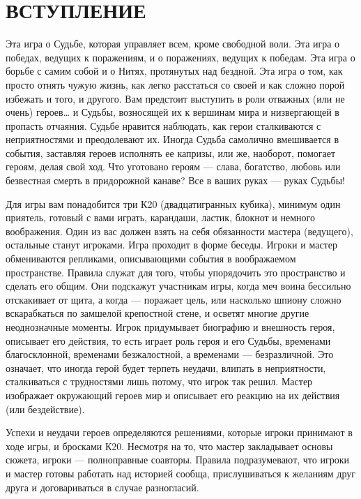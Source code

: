 \chapter*{ВСТУПЛЕНИЕ}
Эта игра о Судьбе, которая управляет всем, кроме свободной воли. Эта игра о победах, ведущих к поражениям, и о поражениях, ведущих к победам. Эта игра о борьбе с самим собой и о Нитях, протянутых над бездной. Эта игра о том, как просто отнять чужую жизнь, как легко расстаться со своей и как сложно порой избежать и того, и другого.
Вам предстоит выступить в роли отважных (или не очень) героев… и Судьбы, возносящей их к вершинам мира и низвергающей в пропасть отчаяния. Судьбе нравится наблюдать, как герои сталкиваются с неприятностями и преодолевают их. Иногда Судьба самолично вмешивается в события, заставляя героев исполнять ее капризы, или же, наоборот, помогает героям, делая свой ход. Что уготовано героям — слава, богатство, любовь или безвестная смерть в придорожной канаве? Все в ваших руках — руках Судьбы!

Для игры вам понадобится три К20 (двадцатигранных кубика), минимум один приятель, готовый с вами играть, карандаши, ластик, блокнот и немного воображения. Один из вас должен взять на себя обязанности мастера (ведущего), остальные станут игроками. Игра проходит в форме беседы. Игроки и мастер обмениваются репликами, описывающими события в воображаемом пространстве. Правила служат для того, чтобы упорядочить это пространство и сделать его общим. Они подскажут участникам игры, когда меч воина бессильно отскакивает от щита, а когда — поражает цель, или насколько шпиону сложно вскарабкаться по замшелой крепостной стене, и осветят многие другие неоднозначные моменты. Игрок придумывает биографию и внешность героя, описывает его действия, то есть играет роль героя и его Судьбы, временами благосклонной, временами безжалостной, а временами — безразличной. Это означает, что иногда герой будет терпеть неудачи, влипать в неприятности, сталкиваться с трудностями лишь потому, что игрок так решил. Мастер изображает окружающий героев мир и описывает его реакцию на их действия (или бездействие).

Успехи и неудачи героев определяются решениями, которые игроки принимают в ходе игры, и бросками К20. Несмотря на то, что мастер закладывает основы сюжета, игроки — полноправные соавторы. Правила подразумевают, что игроки и мастер готовы работать над историей сообща, прислушиваться к желаниям друг друга и договариваться в случае разногласий.




